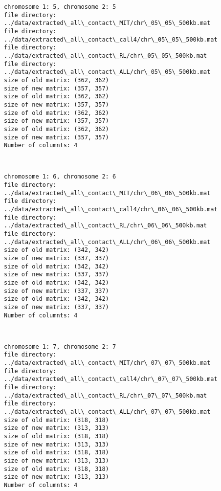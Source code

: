 \documentclass[11pt]{article}
\begin{document}
    \begin{Verbatim}[commandchars=\\\{\}]
chromosome 1: 5, chromosome 2: 5
file directory: ../data/extracted\_all\_contact\_MIT/chr\_05\_05\_500kb.mat
file directory: ../data/extracted\_all\_contact\_call4/chr\_05\_05\_500kb.mat
file directory: ../data/extracted\_all\_contact\_RL/chr\_05\_05\_500kb.mat
file directory: ../data/extracted\_all\_contact\_ALL/chr\_05\_05\_500kb.mat
size of old matrix: (362, 362)
size of new matrix: (357, 357)
size of old matrix: (362, 362)
size of new matrix: (357, 357)
size of old matrix: (362, 362)
size of new matrix: (357, 357)
size of old matrix: (362, 362)
size of new matrix: (357, 357)
Number of columnts: 4

    \end{Verbatim}

    \begin{center}
    \end{center}
    { \hspace*{\fill} \\}
    
    \begin{Verbatim}[commandchars=\\\{\}]
chromosome 1: 6, chromosome 2: 6
file directory: ../data/extracted\_all\_contact\_MIT/chr\_06\_06\_500kb.mat
file directory: ../data/extracted\_all\_contact\_call4/chr\_06\_06\_500kb.mat
file directory: ../data/extracted\_all\_contact\_RL/chr\_06\_06\_500kb.mat
file directory: ../data/extracted\_all\_contact\_ALL/chr\_06\_06\_500kb.mat
size of old matrix: (342, 342)
size of new matrix: (337, 337)
size of old matrix: (342, 342)
size of new matrix: (337, 337)
size of old matrix: (342, 342)
size of new matrix: (337, 337)
size of old matrix: (342, 342)
size of new matrix: (337, 337)
Number of columnts: 4

    \end{Verbatim}

    \begin{center}
    \end{center}
    { \hspace*{\fill} \\}
    
    \begin{Verbatim}[commandchars=\\\{\}]
chromosome 1: 7, chromosome 2: 7
file directory: ../data/extracted\_all\_contact\_MIT/chr\_07\_07\_500kb.mat
file directory: ../data/extracted\_all\_contact\_call4/chr\_07\_07\_500kb.mat
file directory: ../data/extracted\_all\_contact\_RL/chr\_07\_07\_500kb.mat
file directory: ../data/extracted\_all\_contact\_ALL/chr\_07\_07\_500kb.mat
size of old matrix: (318, 318)
size of new matrix: (313, 313)
size of old matrix: (318, 318)
size of new matrix: (313, 313)
size of old matrix: (318, 318)
size of new matrix: (313, 313)
size of old matrix: (318, 318)
size of new matrix: (313, 313)
Number of columnts: 4

    \end{Verbatim}
\end{document}
